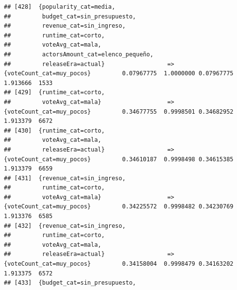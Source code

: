 \documentclass[
]{article}
\begin{document}
\begin{verbatim}
## [428]  {popularity_cat=media,                                                                                                   
##         budget_cat=sin_presupuesto,                                                                                             
##         revenue_cat=sin_ingreso,                                                                                                
##         runtime_cat=corto,                                                                                                      
##         voteAvg_cat=mala,                                                                                                       
##         actorsAmount_cat=elenco_pequeño,                                                                                        
##         releaseEra=actual}                  => {voteCount_cat=muy_pocos}         0.07967775  1.0000000 0.07967775 1.913666  1533
## [429]  {runtime_cat=corto,                                                                                                      
##         voteAvg_cat=mala}                   => {voteCount_cat=muy_pocos}         0.34677755  0.9998501 0.34682952 1.913379  6672
## [430]  {runtime_cat=corto,                                                                                                      
##         voteAvg_cat=mala,                                                                                                       
##         releaseEra=actual}                  => {voteCount_cat=muy_pocos}         0.34610187  0.9998498 0.34615385 1.913379  6659
## [431]  {revenue_cat=sin_ingreso,                                                                                                
##         runtime_cat=corto,                                                                                                      
##         voteAvg_cat=mala}                   => {voteCount_cat=muy_pocos}         0.34225572  0.9998482 0.34230769 1.913376  6585
## [432]  {revenue_cat=sin_ingreso,                                                                                                
##         runtime_cat=corto,                                                                                                      
##         voteAvg_cat=mala,                                                                                                       
##         releaseEra=actual}                  => {voteCount_cat=muy_pocos}         0.34158004  0.9998479 0.34163202 1.913375  6572
## [433]  {budget_cat=sin_presupuesto,                                                                                             

\end{verbatim}
\end{document}

